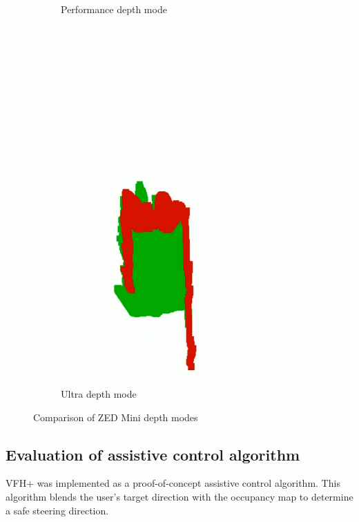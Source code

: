\begin{figure}[b]
\begin{subfigure}{.2\textwidth}
        \caption{Performance depth mode}
    \end{subfigure}
    \begin{subfigure}{.2\textwidth}
        \centering
        \includegraphics[width=\linewidth]{images/pcloud_indoor_ultra.PNG}
        \caption{Ultra depth mode}
    \end{subfigure}
    \caption{Comparison of ZED Mini depth modes}
    \label{fig:depth_mode_comparison}
\end{figure}

\subsection{Evaluation of assistive control algorithm}
VFH+ was implemented as a proof-of-concept assistive control algorithm.
This algorithm blends the user's target direction with the occupancy map
to determine a safe steering direction.

